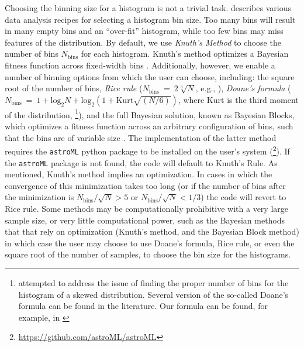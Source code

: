 \documentclass{emulateapj}
\begin{document}
Choosing the binning size for a histogram is not a trivial task.  \citet{hogg08} describes various data analysis recipes for selecting a histogram bin size. Too many bins will result in many empty bins and an ``over-fit'' histogram, while too few bins may miss features of the distribution. 
By default, we use \emph{Knuth's Method} to choose the number of bins $N_\mathrm{bins}$ for each histogram. Knuth's method  optimizes  a Bayesian fitness function across fixed-width bins \citep{knuth06}. Additionally, however, we enable a number of binning options from which the user can choose, including: 
the square root of the number of bins, \emph{Rice rule} ($N_\mathrm{bins}~=~2\sqrt[3]{N}$, e.g., \citealt{hastie09}), 
\emph{Doane's formula} ($N_\mathrm{bins}~=~1 + \mathrm{log}_2{N} + \mathrm{log}_2\left(1 + \mathrm{Kurt}\sqrt{(N / 6)}\right)$, where Kurt is the third moment of the distribution, \citealt{doane76}\footnote{\citet{doane76} attempted to address the issue of finding the proper number of bins for the histogram of a skewed distribution. Several version of the so-called Doane's formula can be found in the literature. Our formula can be found, for example, in \citealt{Pharmacokinetic}}), and the full Bayesian solution, known as Bayesian Blocks, which optimizes a fitness function across an arbitrary configuration of bins, such that the bins are of variable size \citep{scargle13}. The implementation of the latter method requires the \verb=astroML= python package to be installed on the user's system (\citealt{astroml}\footnote{\url{https://github.com/astroML/astroML}}). If the \verb=astroML= package is not found, the code will default to Knuth's Rule. 
As mentioned, Knuth's method implies an optimization. In cases in which the convergence of this minimization takes too long (or if the number of bins after the minimization is  $N_\mathrm{bins}/\sqrt{N} > 5$ or $N_\mathrm{bins}/\sqrt{N} < 1/3$) the code will revert to Rice rule.
Some methods may be computationally prohibitive with a very large sample size, or very little computational power, such as the Bayesian methods that that rely on optimization (Knuth's method, and the Bayesian Block method) in which case the user may choose to use Doane's formula, Rice rule, or even the square root of the number of samples, to choose the bin size for the histograms. 
\end{document}
